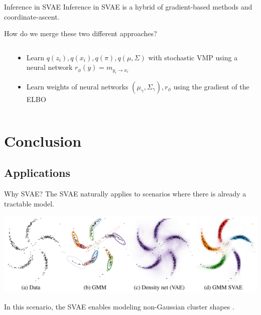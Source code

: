 \documentclass[10pt, compress]{beamer}
\begin{document}
\begin{frame}{Inference in SVAE}
  Inference in SVAE is a hybrid of gradient-based methods and
  coordinate-ascent.

  \pause

  How do we merge these two different approaches?
  \pause
  \begin{columns}
    \begin{column}{0.25\textwidth}
      \centering
      
    \end{column}
    \begin{column}{0.75\textwidth}
      \begin{itemize}
          \pause
        \item Learn $q(z_i), q(x_i), q(\pi), q(\mu, \Sigma)$ with stochastic VMP using a neural network 
          $r_\phi(y) = m_{y_i \rightarrow x_i}$
          \pause
        \item Learn weights of neural networks $(\mu_\gamma, \Sigma_\gamma), r_\phi$ using the gradient of the ELBO
      \end{itemize}
    \end{column}
  \end{columns}
\end{frame}

\section{Conclusion}

\subsection{Applications}
\begin{frame}{Why SVAE?}
  The SVAE naturally applies to scenarios where there is already a tractable model.

  \pause
  \begin{center}
    \includegraphics[frame,width=\textwidth]{img/svae-example}
  \end{center}

  \pause
  In this scenario, the SVAE enables modeling non-Gaussian cluster shapes \cite{svae}.
\end{frame}
\end{document}
